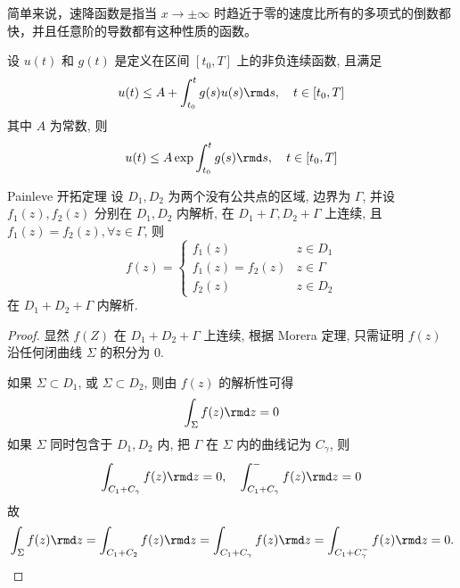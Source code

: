 简单来说，速降函数是指当 $ x \to \pm \infty $ 时趋近于零的速度比所有的多项式的倒数都快，并且任意阶的导数都有这种性质的函数。
\begin{definition}\label{ch1-def-Gronwall}
    设 $ u(t) $ 和 $ g(t) $ 是定义在区间 $ [t_{0}, T] $ 上的非负连续函数, 且满足
    \begin{equation}
        u(t) \leq A + \int_{t_{0}}^{t} g(s) u(s) \rmd s, \quad t \in [t_{0}, T]
    \end{equation}
    其中 $ A $ 为常数, 则
    \begin{equation}
        u(t) \leq A \exp{\int_{t_{0}}^{t} g(s) \rmd s}, \quad t \in [t_{0}, T]
    \end{equation}
\end{definition}
\begin{theorem}{Painleve 开拓定理}\label{ch1-thm-Painleve}
    设 $ D_{1}, D_{2} $ 为两个没有公共点的区域, 边界为 $ \Gamma $, 并设 $ f_{1}(z), f_{2}(z) $ 分别在 $ D_{1}, D_{2} $ 内解析, 在 $ D_{1} + \Gamma, D_{2} + \Gamma $ 上连续, 且 $ f_{1}(z) = f_{2}(z), \forall z \in \Gamma $, 则
    \begin{equation}
        f(z) = \begin{cases}
            f_{1}(z)            & z \in D_{1}  \\
            f_{1}(z) = f_{2}(z) & z \in \Gamma \\
            f_{2}(z)            & z \in D_{2}
        \end{cases}
    \end{equation}
    在 $ D_{1} + D_{2} + \Gamma $ 内解析.
\end{theorem}
\begin{proof}
    显然 $ f(Z) $ 在 $ D_{1} + D_{2} + \Gamma $ 上连续, 根据 Morera 定理, 只需证明 $ f(z) $ 沿任何闭曲线 $ \Sigma $ 的积分为 $ 0 $.

    如果 $ \Sigma \subset D_{1} $, 或 $ \Sigma \subset D_{2} $, 则由 $ f(z) $ 的解析性可得
    \begin{equation}
        \int_{\Sigma} f(z) \rmd z = 0
    \end{equation}
    如果 $ \Sigma $ 同时包含于 $ D_{1}, D_{2} $ 内, 把 $ \Gamma $ 在 $ \Sigma $ 内的曲线记为 $ C_{\gamma} $, 则
    \begin{equation}
        \int_{C_{1} + C_{\gamma}} f(z) \rmd z = 0, \quad \int_{C_{1} + C_{\gamma}}^{-} f(z) \rmd z = 0
    \end{equation}
    故
    \begin{equation}
        \int_{\Sigma} f(z) \rmd z =  \int_{C_{1} + C_{2}} f(z) \rmd z = \int_{C_{1} + C_{\gamma}} f(z) \rmd z = \int_{C_{1} + C_{\gamma}^{-}} f(z) \rmd z = 0.
    \end{equation}
\end{proof}

